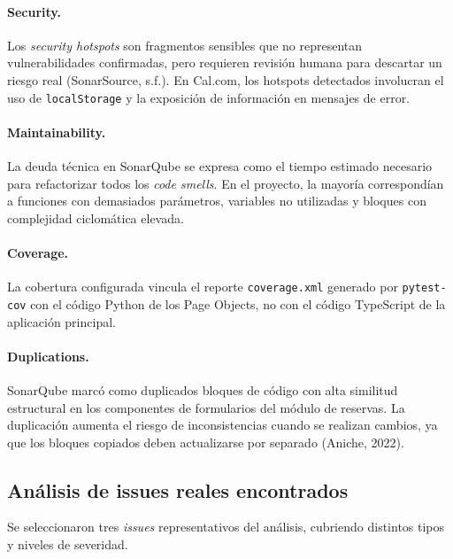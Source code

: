 \documentclass[12pt,letterpaper]{article}
\begin{document}
\paragraph{Security.}
Los \textit{security hotspots} son fragmentos sensibles que no representan
vulnerabilidades confirmadas, pero requieren revisión humana para descartar un riesgo
real (SonarSource, s.f.). En Cal.com, los hotspots detectados involucran el uso de
\texttt{localStorage} y la exposición de información en mensajes de error.

\paragraph{Maintainability.}
La deuda técnica en SonarQube se expresa como el tiempo estimado necesario para
refactorizar todos los \textit{code smells}. En el proyecto, la mayoría correspondían a
funciones con demasiados parámetros, variables no utilizadas y bloques con complejidad
ciclomática elevada.

\paragraph{Coverage.}
La cobertura configurada vincula el reporte \texttt{coverage.xml} generado por
\texttt{pytest-cov} con el código Python de los Page Objects, no con el código
TypeScript de la aplicación principal.

\paragraph{Duplications.}
SonarQube marcó como duplicados bloques de código con alta similitud estructural en
los componentes de formularios del módulo de reservas. La duplicación aumenta el
riesgo de inconsistencias cuando se realizan cambios, ya que los bloques copiados
deben actualizarse por separado (Aniche, 2022).

\subsection{Análisis de issues reales encontrados}

Se seleccionaron tres \textit{issues} representativos del análisis, cubriendo distintos
tipos y niveles de severidad.
\end{document}
